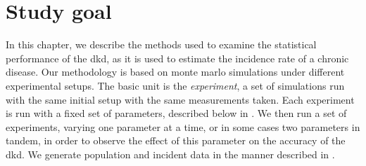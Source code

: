 

\section{Study goal}
\label{sec:method:goal}

In this chapter, we describe the methods used to examine the statistical performance of the \gls{dkd},
as it is used to estimate the \gls{incidence rate} of a chronic disease.
Our methodology is based on monte marlo simulations under different experimental setups.
The basic unit is the \textit{experiment},
a set of simulations run with the same initial setup with the same measurements taken.
Each experiment is run with a fixed set of parameters,
described below in .
We then run a set of experiments,
varying one parameter at a time, or in some cases two parameters in tandem,
in order to observe the effect of this parameter on the accuracy of the \gls{dkd}.
We generate population and incident data in the manner described in .


